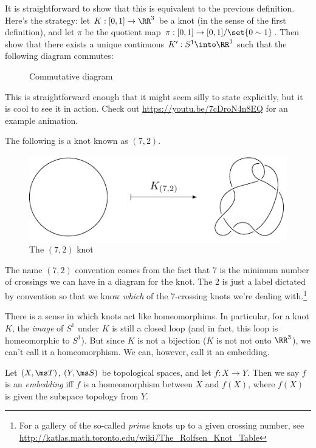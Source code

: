 It is straightforward to show that this is equivalent to the previous
definition. Here's the strategy: let $K : [0,1] \to \RR^3$ be a knot
(in the sense of the first definition), and let $\pi$ be the quotient
map $\pi : [0,1] \to [0,1]/\set{0 \sim 1}$. Then show that there
exists a unique continuous $K' : S^1 \into \RR^3$ such that the
following diagram commutes:
\begin{figure}[H]
  \centering
  \caption{Commutative diagram}
\end{figure}
This is straightforward enough that it might seem silly to state
explicitly, but it is cool to see it in action. Check out
\href{https://youtu.be/7cDroN4n8EQ}{https://youtu.be/7cDroN4n8EQ} for
an example animation.
\begin{example}
  The following is a knot known as $(7,2)$.
  \begin{figure}[H]
    \centering
    \includegraphics{figures/background/embed-72.pdf}
    \caption{The $(7,2)$ knot}\qedhere
  \end{figure}
  \label{ex:72knot}
\end{example}
The name $(7,2)$ convention comes from the fact that 7 is the minimum
number of crossings we can have in a diagram for the knot. The 2 is
just a label dictated by convention so that we know \emph{which} of
the 7-crossing knots we're dealing with.\footnote{For a gallery of the
  so-called \emph{prime} knots up to a given crossing number, see
  \href{http://katlas.math.toronto.edu/wiki/The_Rolfsen_Knot_Table}{http://katlas.math.toronto.edu/wiki/The\_Rolfsen\_Knot\_Table}}

There is a sense in which knots act like homeomorphims. In particular,
for a knot $K$, the \emph{image} of $S^1$ under $K$ is still a closed
loop (and in fact, this loop is homeomorphic to $S^1$). But since $K$
is not a bijection ($K$ is not not onto $\RR^3$), we can't call it a
homeomorphism. We can, however, call it an embedding.
\begin{definition}[Embedding]
  Let $(X,\ms T)$, $(Y, \ms S)$ be topological spaces, and let $f : X
  \to Y$. Then we say $f$ is an \emph{embedding} iff $f$ is a
  homeomorphism between $X$ and $f(X)$, where $f(X)$ is given the
  subspace topology from $Y$.
\end{definition}

